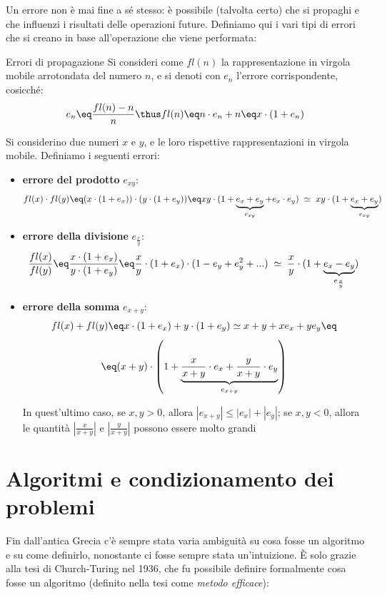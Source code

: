 Un errore non è mai fine a sé stesso: è possibile (talvolta certo) che si propaghi e che influenzi i risultati delle operazioni future. Definiamo qui i vari tipi di errori che si creano in base all'operazione che viene performata:
\begin{definition}{Errori di propagazione}
    Si consideri come $fl(n)$ la rappresentazione in virgola mobile arrotondata del numero $n$, e si denoti con $e_n$ l'errore corrispondente, cosicché:
    \[ e_n \eq \frac{fl(n) - n}{n} \thus fl(n) \eq n \cdot e_n + n \eq x \cdot (1 + e_n) \]

    Si considerino due numeri $x$ e $y$, e le loro rispettive rappresentazioni in virgola mobile. Definiamo i seguenti errori:
    \begin{itemize}
        \item \textbf{errore del prodotto} $e_{xy}$:
        \[ fl(x) \cdot fl(y) \eq (x \cdot (1 + e_x)) \cdot (y \cdot (1 + e_y)) \eq xy \cdot (1 + \underbrace{e_x + e_y}_{e_{xy}} + e_x \cdot e_y) \; \simeq \; xy \cdot (1 + \underbrace{e_x + e_y}_{e_{xy}}) \]

        \item \textbf{errore della divisione} $e_{\frac{x}{y}}$:
        \[ \frac{fl(x)}{fl(y)} \eq \frac{x \cdot (1 + e_x)}{y \cdot (1 + e_y)} \eq \frac{x}{y} \cdot (1 + e_x) \cdot (1 - e_y + e^2_y + ...) \; \simeq \; \frac{x}{y} \cdot (1 + \underbrace{e_x - e_y}_{e_{\frac{x}{y}}}) \]

        \item \textbf{errore della somma} $e_{x+y}$:
        \[ fl(x) + fl(y) \eq x \cdot(1 + e_x) + y \cdot (1 + e_y) \simeq x + y + xe_x + ye_y \eq \]
        \[ \eq (x + y) \cdot \left(1 + \underbrace{\frac{x}{x + y} \cdot e_x + \frac{y}{x + y} \cdot e_y}_{e_{x+y}} \right) \]

        In quest'ultimo caso, se $x, y > 0$, allora $|e_{x+y}| \leq |e_x| + |e_y|$; se $x, y < 0$, allora le quantità $\left|\frac{x}{x + y}\right|$ e $\left|\frac{y}{x + y}\right|$ possono essere molto grandi
    \end{itemize}
\end{definition}

\section{Algoritmi e condizionamento dei problemi}

Fin dall'antica Grecia c'è sempre stata varia ambiguità su cosa fosse un algoritmo e su come definirlo, nonostante ci fosse sempre stata un'intuizione. È solo grazie alla tesi di Church-Turing nel 1936, che fu possibile definire formalmente cosa fosse un algoritmo (definito nella tesi come \textit{metodo efficace}):

